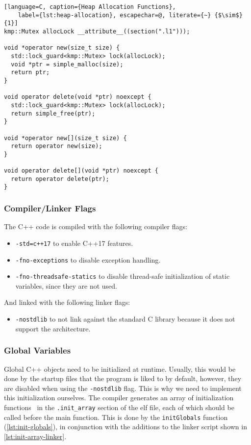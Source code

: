 \begin{lstlisting}[language=C, caption={Heap Allocation Functions},
	label={lst:heap-allocation}, escapechar=@, literate={~} {$\sim$}{1}]
kmp::Mutex allocLock __attribute__((section(".l1")));

void *operator new(size_t size) {
  std::lock_guard<kmp::Mutex> lock(allocLock);
  void *ptr = simple_malloc(size);
  return ptr;
}

void operator delete(void *ptr) noexcept {
  std::lock_guard<kmp::Mutex> lock(allocLock);
  return simple_free(ptr);
}

void *operator new[](size_t size) {
  return operator new(size);
}

void operator delete[](void *ptr) noexcept {
  return operator delete(ptr);
}
\end{lstlisting}

\subsubsection{Compiler/Linker Flags}

The C++ code is compiled with the following compiler flags:
\begin{itemize}
	\item \texttt{-std=c++17} to enable C++17 features.
	\item \texttt{-fno-exceptions} to disable exception handling.
	\item \texttt{-fno-threadsafe-statics} to disable thread-safe initialization of static
	      variables, since they are not used.
\end{itemize}

And linked with the following linker flags:
\begin{itemize}
	\item \texttt{-nostdlib} to not link against the standard C library because it does not support
	      the architecture.
\end{itemize}

\subsubsection{Global Variables}

Global C++ objects need to be initialized at runtime. Usually, this would be done by the startup
files that the program is liked to by default, however, they are disabled when using the
\texttt{-nostdlib} flag. This is why we need to implement this initialization ourselves. The
compiler generates an array of initialization functions~\cite{crt-startup} in the
\texttt{.init\_array} section of the \gls{elf} file, each of which should be called before the main
function. This is done by the \texttt{initGlobals} function (\cref{lst:init-globals}), in
conjunction with the additions to the linker script shown in \cref{lst:init-array-linker}.

